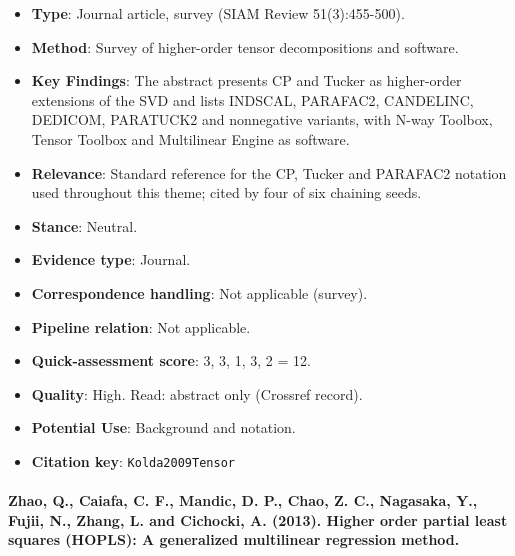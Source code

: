 \documentclass[journal,onecolumn]{IEEEtran}
\begin{document}
\begin{itemize}

\item{} \textbf{Type}: Journal article, survey (SIAM Review 51(3):455-500).

\item{} \textbf{Method}: Survey of higher-order tensor decompositions and software.

\item{} \textbf{Key Findings}: The abstract presents CP and Tucker as higher-order extensions of the SVD and lists INDSCAL, PARAFAC2, CANDELINC, DEDICOM, PARATUCK2 and nonnegative variants, with N-way Toolbox, Tensor Toolbox and Multilinear Engine as software.

\item{} \textbf{Relevance}: Standard reference for the CP, Tucker and PARAFAC2 notation used throughout this theme; cited by four of six chaining seeds.

\item{} \textbf{Stance}: Neutral.

\item{} \textbf{Evidence type}: Journal.

\item{} \textbf{Correspondence handling}: Not applicable (survey).

\item{} \textbf{Pipeline relation}: Not applicable.

\item{} \textbf{Quick-assessment score}: 3, 3, 1, 3, 2 = 12.

\item{} \textbf{Quality}: High. Read: abstract only (Crossref record).

\item{} \textbf{Potential Use}: Background and notation.

\item{} \textbf{Citation key}: \texttt{Kolda2009Tensor}

\end{itemize}

\paragraph{Zhao, Q., Caiafa, C. F., Mandic, D. P., Chao, Z. C., Nagasaka, Y., Fujii, N., Zhang, L. and Cichocki, A. (2013). Higher order partial least squares (HOPLS): A generalized multilinear regression method.~\cite{Zhao2013HOPLS}}\mbox{}
\end{document}
